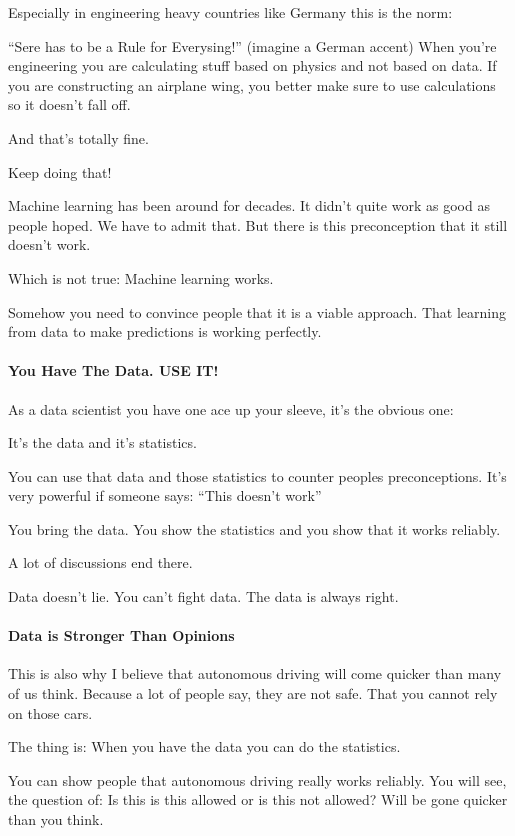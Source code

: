 \documentclass[12pt]{scrartcl} %
\begin{document}
Especially in engineering heavy countries like Germany this is the norm:

“Sere has to be a Rule for Everysing!” (imagine a German accent)
When you’re engineering you are calculating stuff based on physics and not based on data. If you are constructing an airplane wing, you better make sure to use calculations so it doesn’t fall off.

And that’s totally fine.

Keep doing that!

Machine learning has been around for decades. It didn’t quite work as good as people hoped. We have to admit that. But there is this preconception that it still doesn’t work.

Which is not true: Machine learning works.

Somehow you need to convince people that it is a viable approach. That learning from data to make predictions is working perfectly.

\paragraph{You Have The Data. USE IT!}

As a data scientist you have one ace up your sleeve, it’s the obvious one: 

It’s the data and it’s statistics.

You can use that data and those statistics to counter peoples preconceptions. It’s very powerful if someone says: “This doesn’t work”

You bring the data. You show the statistics and you show that it works reliably.

A lot of discussions end there. 

Data doesn’t lie. You can’t fight data.
The data is always right.

\paragraph{Data is Stronger Than Opinions}

This is also why I believe that autonomous driving will come quicker than many of us think. Because a lot of people say, they are not safe. That you cannot rely on those cars.

The thing is: When you have the data you can do the statistics.

You can show people that autonomous driving really works reliably. You will see, the question of: Is this is this allowed or is this not allowed? Will be gone quicker than you think.
\end{document}
